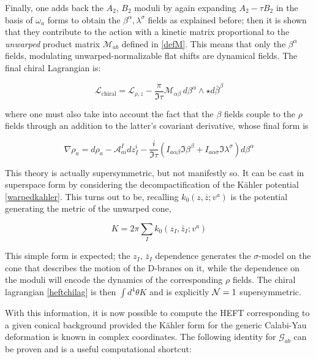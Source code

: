 Finally, one adds back the $A_2$, $B_2$ moduli by again expanding $A_2 - \tau B_2$ in the basis of $\omega_a$ forms to obtain the $\beta^\alpha, \lambda^\sigma$ fields as explained before; then it is shown that they contribute to the action with a kinetic matrix proportional to the \emph{unwarped} product matrix $\mathcal{M}_{ab}$ defined in \eqref{defM}. This means that only the $\beta^\alpha$ fields, modulating unwarped-normalizable flat shifts are dynamical fields. The final chiral Lagrangian is:

\begin{equation}
	\mathcal{L}_\text{chiral} = \mathcal{L}_{\rho,z} - \frac{\pi}{\Im\tau} \mathcal{M}_{\alpha\beta} \,d\beta^\alpha \wedge \star d\bar \beta^\beta
	\label{heftchilag}
\end{equation}

where one must also take into account the fact that the $\beta$ fields couple to the $\rho$ fields through an addition to the latter's covariant derivative, whose final form is

\begin{equation}
	\nabla \rho_a = d\rho_a - \mathcal{A}_{ai}^I dz^i_I - \frac{i}{\Im \tau}\left( I_{a\alpha\beta} \Im \beta^\beta + I_{a\alpha\sigma} \Im \lambda^\sigma \right) d\beta^\alpha
	\label{}
\end{equation}

This theory is actually supersymmetric, but not manifestly so. It can be cast in superspace form by considering the decompactification of the K\"ahler potential \eqref{warpedkahler}. This turns out to be, recalling $k_0(z,\bar z; v^a)$ is the potential generating the metric of the unwarped cone,

\begin{equation}
	K = 2\pi \sum_I k_0(z_I, \bar z_I; v^a)
	\label{heftkahler}
\end{equation}

This simple form is expected; the $z_I$, $\bar z_I$ dependence generates the $\sigma$-model on the cone that describes the motion of the D-branes on it, while the dependence on the moduli will encode the dynamics of the corresponding $\rho$ fields. The chiral lagrangian \eqref{heftchilag} is then $\int d^4 \theta K$ and is explicitly $\mathcal{N} = 1$ supersymmetric.

With this information, it is now possible to compute the HEFT corresponding to a given conical background provided the K\"ahler form for the generic Calabi-Yau deformation is known in complex coordinates. The following identity for $\mathcal{G}_{ab}$ can be proven \cite{MZ} and is a useful computational shortcut:

